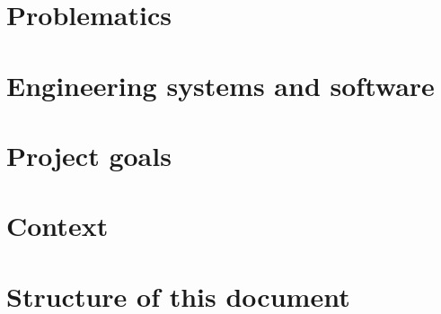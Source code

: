 \section{Problematics}
\section{Engineering systems and software}
\section{Project goals}
\section{Context}
\section{Structure of this document}
